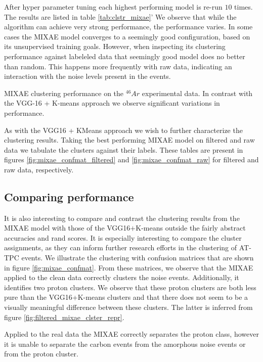 \documentclass[review,number,sort&compress]{elsarticle}
\begin{document}
After hyper parameter tuning each highest performing model is re-run $10$ times. The results are listed in table \ref{tab:clstr_mixae}'
We observe that while the algorithm can achieve very strong performance, the performance varies. In some cases the MIXAE model converges to a seemingly good configuration, based on its unsupervised training goals. However, when inspecting its clustering performance against labeleled data that seemingly good model does no better than random. 
This happens more frequently with raw data, indicating an interaction with the noise levels present in the events. 
 
\begin{table}[H]
\centering 
\caption[MIXAE clustering performance]{MIXAE clustering performance on the ${}^{46} Ar$ experimental data. In contrast with the VGG-16 + K-means approach we observe  significant variations in performance.}\label{tab:clstr_mixae}

\end{table}

As with the VGG16 + KMeans approach we wish to further characterize the clustering results. Taking the best performing MIXAE model on filtered and raw data we tabulate the clusters against their labels. These tables are present in figures \ref{fig:mixae_confmat_filtered} and \ref{fig:mixae_confmat_raw} for filtered and raw data, respectively.
 
\subsection{Comparing performance}

It is also interesting to compare and contrast the clustering results from the MIXAE model with those of the VGG16$+$K-means outside the fairly abstract accuracies and rand scores. It is especially interesting to compare the cluster assignments, as they can inform further research efforts in the clustering of AT-TPC events. We illustrate the clustering with confusion matrices that are shown in figure \ref{fig:mixae_confmat}. From these matrices, we observe that the MIXAE applied to the clean data correctly clusters the noise events. Additionally, it identifies two proton clusters. We observe that these proton clusters are both less pure than the VGG16+K-means clusters and that there does not seem to be a visually meaningful difference between these clusters. The latter is inferred from figure \ref{fig:filtered_mixae_clster_repr}. 

Applied to the real data the MIXAE correctly separates the proton class, however it is unable to separate the carbon events from the amorphous noise events or from the proton cluster. 
\end{document}
